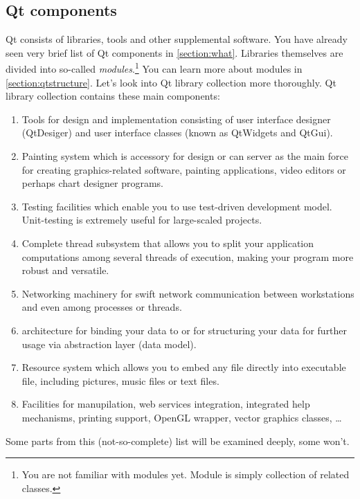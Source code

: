\subsection{Qt components}\label{section:components}
Qt consists of libraries, tools and other supplemental software. You have already seen very brief list of Qt components in \autoref{section:what}. Libraries themselves are divided into so-called \textit{modules}.\footnote{You are not familiar with modules yet. Module is simply collection of related classes.} You can learn more about modules in \autoref{section:qtstructure}. Let's look into Qt library collection more thoroughly. Qt library collection contains these main components:
\begin{enumerate}
\item Tools for  design and implementation consisting of user interface designer (QtDesiger) and user interface classes (known as QtWidgets and QtGui).
\item Painting system which is accessory for  design or can server as the main force for creating graphics-related software, \eg painting applications, video editors or perhaps chart designer programs.
\item Testing facilities which enable you to use test-driven development model. Unit-testing is extremely useful for large-scaled projects.
\item Complete thread subsystem that allows you to split your application computations among several threads of execution, making your program more robust and versatile.
\item Networking machinery for swift network communication between workstations and even among processes or threads.
\item {} architecture for binding your data to  or for structuring your data for further usage via abstraction layer (data model).
\item Resource system which allows you to embed any file directly into executable file, including pictures, music files or text files.
\item Facilities for  manupilation, web services integration, integrated help mechanisms, printing support, OpenGL wrapper, vector graphics classes, \ldots
\end{enumerate}

Some parts from this (not-so-complete) list will be examined deeply, some won't.

